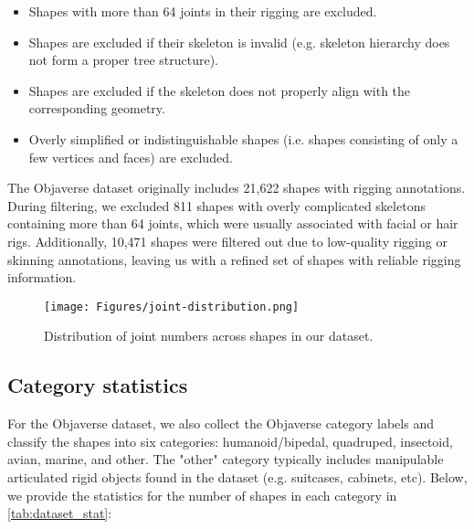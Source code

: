\begin{itemize}
    \item Shapes with more than 64 joints in their rigging are excluded.
    \item Shapes are excluded if their skeleton is invalid (e.g. skeleton hierarchy does not form a proper 
    tree structure).
    \item Shapes are excluded if the skeleton does not properly align with the corresponding geometry.
    \item Overly simplified or indistinguishable shapes (i.e. shapes consisting of only a few vertices and faces) are excluded.
\end{itemize}

The Objaverse dataset originally includes 21,622 shapes with rigging annotations. During filtering, we excluded 811 shapes with overly complicated skeletons containing more than 64 joints, which were usually associated with facial or hair rigs. Additionally, 10,471 shapes were filtered out due to low-quality rigging or skinning annotations, leaving us with a refined set of shapes with reliable rigging information.

\begin{figure}[t]
\texttt{[image: Figures/joint-distribution.png]}
\caption{Distribution of joint numbers across shapes in our dataset.}
\label{fig:joint_number_distribution}
\end{figure}

\subsection{Category statistics}

For the Objaverse dataset, we also collect the Objaverse category labels and classify the shapes into six categories: humanoid/bipedal, quadruped, insectoid, avian, marine, and other. The "other" category typically includes manipulable articulated rigid objects found in the dataset (e.g. suitcases, cabinets, etc). Below, we provide the statistics for the number of shapes in each category in \cref{tab:dataset_stat}:

\begin{table}[H]
    \caption{Category statistics of the filtered Objaverse dataset.}
    \label{tab:dataset_stat}
    \small
    \centering
    \setlength{\tabcolsep}{5pt}
\end{table}

